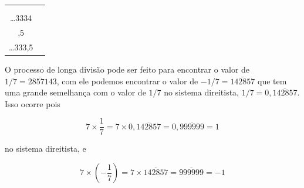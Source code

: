 \documentclass{report}
\newcommand*{\carry}[1][1]{\overset{#1}}
\theoremstyle{definition}
\begin{document}
\bigskip

\begin{tabular*}{330pt}{c c}

\begin{minipage}{150pt}
\[
    \begin{array}{@{}B1}
                \ldots \carry 6 \carry 6 \carry 6 7\\
                {} \times 2 \\ \hline
                \ldots 3334
    \end{array}
\]

\begin{equation*}
    \implies \frac{2}{3} = 2 \times \frac{1}{3} = \overline3 4
\end{equation*}
\end{minipage}

    &

\begin{minipage}{150pt}
\[
    \begin{array}{@{}B1}
                \ldots \carry[3] 6 \carry[3] 6 \carry[3] 6 7\\
                {} \times 0,5 \\ \hline
                \ldots 333,5
    \end{array}
\]

\begin{equation*}
    \implies \frac{1}{6} = \frac{1}{2} \times \frac{1}{3} = \overline3,5
\end{equation*}
\end{minipage}

\end{tabular*}

\bigskip

O processo de longa divisão pode ser feito para encontrar o valor de $1/7=\overline{285714}3$, com ele podemos encontrar o valor de $-1/7=\overline{142857}$ que tem uma grande semelhança com o valor de $1/7$ no sistema direitista, $1/7=0,\overline{142857}$. Isso ocorre pois

\begin{equation*}
    7 \times \frac{1}{7} = 7 \times 0,\overline{142857} = 0,\overline{999999} = 1
\end{equation*}

no sistema direitista, e

\begin{equation*}
    7 \times \left( -\frac{1}{7} \right) = 7 \times \overline{142857} = \overline{999999} = -1
\end{equation*}
\end{document}
